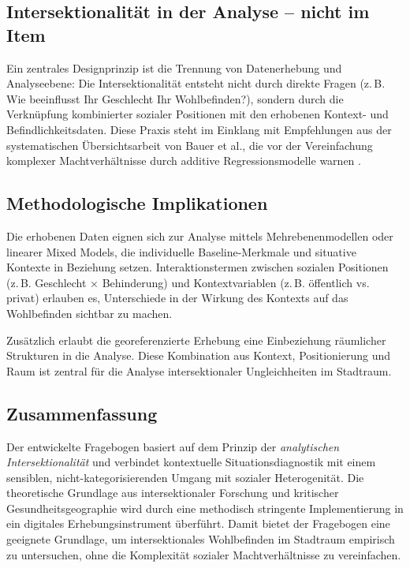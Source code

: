 \subsection{Intersektionalität in der Analyse – nicht im Item}

Ein zentrales Designprinzip ist die Trennung von Datenerhebung und Analyseebene: Die Intersektionalität entsteht nicht durch direkte Fragen (z.\,B. \glqq Wie beeinflusst Ihr Geschlecht Ihr Wohlbefinden?\grqq), sondern durch die Verknüpfung kombinierter sozialer Positionen mit den erhobenen Kontext- und Befindlichkeitsdaten. Diese Praxis steht im Einklang mit Empfehlungen aus der systematischen Übersichtsarbeit von Bauer et al., die vor der Vereinfachung komplexer Machtverhältnisse durch additive Regressionsmodelle warnen \parencite{bauerIntersectionalityQuantitativeResearch2021}.

\subsection{Methodologische Implikationen}

Die erhobenen Daten eignen sich zur Analyse mittels Mehrebenenmodellen oder linearer Mixed Models, die individuelle Baseline-Merkmale und situative Kontexte in Beziehung setzen. Interaktionstermen zwischen sozialen Positionen (z.\,B. Geschlecht × Behinderung) und Kontextvariablen (z.\,B. öffentlich vs. privat) erlauben es, Unterschiede in der Wirkung des Kontexts auf das Wohlbefinden sichtbar zu machen.

Zusätzlich erlaubt die georeferenzierte Erhebung eine Einbeziehung räumlicher Strukturen in die Analyse. Diese Kombination aus Kontext, Positionierung und Raum ist zentral für die Analyse intersektionaler Ungleichheiten im Stadtraum.

\subsection{Zusammenfassung}

Der entwickelte Fragebogen basiert auf dem Prinzip der \emph{analytischen Intersektionalität} und verbindet kontextuelle Situationsdiagnostik mit einem sensiblen, nicht-kategorisierenden Umgang mit sozialer Heterogenität. Die theoretische Grundlage aus intersektionaler Forschung und kritischer Gesundheitsgeographie wird durch eine methodisch stringente Implementierung in ein digitales Erhebungsinstrument überführt. Damit bietet der Fragebogen eine geeignete Grundlage, um intersektionales Wohlbefinden im Stadtraum empirisch zu untersuchen, ohne die Komplexität sozialer Machtverhältnisse zu vereinfachen.

